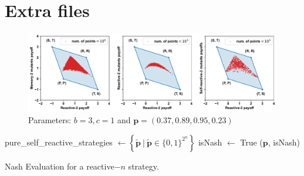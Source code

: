 \documentclass{article}
\begin{document}
\section{Extra files}

\begin{figure}[htbp]
    \centering
    \includegraphics[width=\textwidth]{figures/sufficiency_of_self_reactive_numerical_example_n_2.pdf}
    \caption{Parameters: $b=3, c=1$ and $\mathbf{p}=(0.37, 0.89, 0.95, 0.23)$}
    \label{fig:enter-label}
\end{figure}


\begin{algorithm}[H]
      pure\_self\_reactive\_strategies $\gets \left\{ \mathbf{\tilde{p}} ~\big|~ \mathbf{\tilde{p}} \in \{0, 1\}^{2 ^ n} \right\}$ \;
      isNash $\gets$ True \; 
      \Return (\(\mathbf{p}\), isNash) \;
      \caption{Nash Evaluation for a reactive$-n$ strategy.}
    \end{algorithm}
\end{document}
